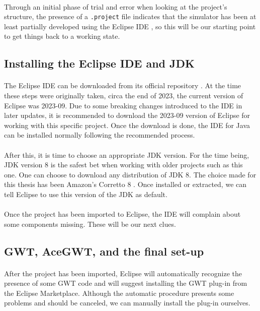 \paragraph{}
Through an initial phase of trial and error when looking at the project's structure, the presence of a \verb|.project| file indicates that the simulator has been at least partially developed using the Eclipse IDE \cite{web:eclipse}, so this will be our starting point to get things back to a working state.
\subsection{Installing the Eclipse IDE and JDK}
\paragraph{}
The Eclipse IDE can be downloaded from its official repository \cite{web:eclipse}. At the time these steps were originally taken, circa the end of 2023, the current version of Eclipse was 2023-09. Due to some breaking changes introduced to the IDE in later updates, it is recommended to download the 2023-09 version of Eclipse for working with this specific project. Once the download is done, the IDE for Java can be installed normally following the recommended process.
\paragraph{}
After this, it is time to choose an appropriate JDK version. For the time being, JDK version 8 is the safest bet when working with older projects such as this one. One can choose to download any distribution of JDK 8. The choice made for this thesis has been Amazon's Corretto 8 \cite{web:amazoncorretto8}. Once installed or extracted, we can tell Eclipse to use this version of the JDK as default.
\paragraph{}
Once the project has been imported to Eclipse, the IDE will complain about some components missing. These will be our next clues.
\subsection{GWT, AceGWT, and the final set-up}
\paragraph{}
After the project has been imported, Eclipse will automatically recognize the presence of some GWT code and will suggest installing the GWT plug-in \cite{web:eclipsegwtplugin} from the Eclipse Marketplace. Although the automatic procedure presents some problems and should be canceled, we can manually install the plug-in ourselves.
